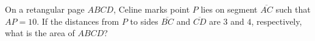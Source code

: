 On a retangular page $ABCD$, Celine marks point $P$ lies on segment $\overline{AC}$ such that $AP=10$. If the distances from $P$ to sides $\overline{BC}$ and $\overline{CD}$ are $3$ and $4$, respectively, what is the area of $ABCD$?

